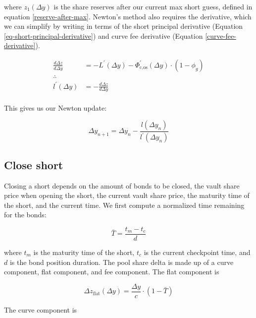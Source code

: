 where $z_1(\Delta y)$ is the share reserves after our current max short guess, defined in equation \eqref{reserve-after-max}.
Newton's method also requires the derivative, which we can simplify by writing in terms of the short principal derivative (Equation \eqref{eq-short-principal-derivative}) and curve fee derivative (Equation \eqref{curve-fee-derivative}).

\begin{equation}\label{delta-shares-derivative}
\begin{aligned}
    \frac{d \Delta z}{d \Delta y} &= -L^{\prime}(\Delta y)
        - \Phi^{\prime}_{\text{c,os}}(\Delta y) \cdot (1 - \phi_g) \\
    \therefore \\
    l^{\prime}(\Delta y) &= -\frac{d \Delta z}{d \Delta y} \\
\end{aligned}
\end{equation}

This gives us our Newton update:

\begin{equation}\label{newton-update}
    \Delta y_{n+1} = \Delta y_{n} - \frac{l(\Delta y_{n})}{l^{\prime}(\Delta y_{n})}
\end{equation}

\subsection{Close short}
Closing a short depends on the amount of bonds to be closed, the vault share price when opening the short, the current vault share price, the maturity time of the short, and the current time.
We first compute a normalized time remaining for the bonds:

\begin{equation}\label{normalized-time-remaining}
    \bar{T} = \frac{t_{m} - t_{c}}{d}
\end{equation}

where $t_{m}$ is the maturity time of the short, $t_c$ is the current checkpoint time, and $d$ is the bond position duration.
The pool share delta is made up of a curve component, flat component, and fee component.
The flat component is

\begin{equation}\label{close-short-flat}
    \Delta z_{\text{flat}}(\Delta y) = \frac{\Delta y}{c} \cdot (1 - \bar{T})
\end{equation}

The curve component is

